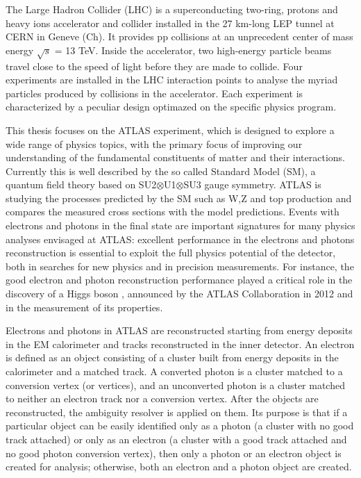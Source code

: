\documentclass[a4paper, oneside, 11pt]{book}
\begin{document}
	The Large Hadron Collider (LHC) \cite{LHC design} is a superconducting two-ring, protons and heavy ions accelerator and collider installed in the 27 km-long LEP tunnel at CERN in Geneve (Ch). It provides pp collisions at an unprecedent center of mass energy $\sqrt{s}$ = 13 TeV. Inside the accelerator, two high-energy particle beams travel close to the speed of light before they are made to collide. Four experiments are installed in the LHC interaction points to analyse the myriad particles produced by collisions in the accelerator. Each experiment is characterized by a peculiar design optimazed on the specific physics program.
	
	This thesis focuses on the ATLAS \cite{ATLAS config} experiment, which is designed to explore a wide range of physics topics, with the primary focus of improving our understanding of the fundamental constituents of matter and their interactions.
	Currently this is well described by the so called Standard Model (SM), a quantum field theory based on SU2$\otimes$U1$\otimes$SU3 gauge symmetry. ATLAS is studying the processes predicted by the SM such as W,Z and top production and compares the measured cross sections with the model predictions. Events with electrons and photons in the final state are important signatures for many
	physics analyses envisaged at ATLAS: excellent performance in the electrons and photons reconstruction is essential to exploit the full physics potential of the detector, both in searches for new physics and in precision measurements. For instance, the good electron and photon reconstruction performance played a critical role in the discovery of a Higgs boson \cite{Higgs}, announced by the ATLAS Collaboration in 2012 and in the measurement of its properties.
	
	Electrons and photons in ATLAS are reconstructed starting from energy deposits in the EM calorimeter and tracks reconstructed in the inner detector. An electron is defined as an object consisting of a cluster built from energy deposits in the calorimeter and a matched track. A converted photon is a cluster matched to a conversion vertex (or vertices), and an unconverted photon is a cluster matched to neither an electron track nor a conversion vertex. After the objects are reconstructed, the ambiguity resolver is applied on them. Its purpose is that if a particular object can be easily identified only as a photon (a cluster with no good track attached) or only as an electron (a cluster with a good track attached and no good photon conversion vertex), then only a photon or an electron object is created for analysis; otherwise, both an electron and a photon object are created.
\end{document}
